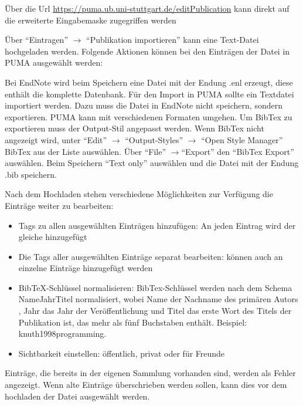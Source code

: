 \begin{tip} Über die Url \url{https://puma.ub.uni-stuttgart.de/editPublication} kann direkt auf die erweiterte Eingabemaske zugegriffen werden
\end{tip}		
Über \enquote{Eintragen} $\to$ \enquote{Publikation importieren} kann eine Text-Datei hochgeladen werden. Folgende Aktionen können bei den Einträgen der Datei in PUMA ausgewählt werden:
\begin{tip}
Bei EndNote wird beim Speichern eine Datei mit der Endung .enl erzeugt, diese enthält die komplette Datenbank. Für den Import in PUMA sollte ein Textdatei importiert werden. Dazu muss die Datei in EndNote nicht speichern, sondern exportieren. PUMA kann mit verschiedenen Formaten umgehen. Um BibTex zu exportieren muss der Output-Stil angepasst werden. Wenn BibTex nicht angezeigt wird, unter \enquote{Edit} $\to$ \enquote{Output-Styles} $\to$ \enquote{Open Style Manager} BibTex aus der Liste auswählen. Über \enquote{File} $\to$\enquote{Export} den \enquote{BibTex Export} auswählen. Beim Speichern \enquote{Text only} auswählen und die Datei mit der Endung .bib speichern.
\end{tip}
Nach dem Hochladen stehen verschiedene Möglichkeiten zur Verfügung die Einträge weiter zu bearbeiten:
\begin{itemize}
\item Tags zu allen ausgewählten Einträgen hinzufügen: An jeden Eintrag wird der gleiche \tag hinzugefügt
\item Die Tags aller ausgewählten Einträge separat bearbeiten: \tags können auch an einzelne Einträge hinzugefügt werden
\item BibTeX-Schlüssel normalisieren: BibTex-Schlüssel werden nach dem Schema NameJahrTitel normalisiert, wobei Name der Nachname des primären Autors , Jahr das Jahr der Veröffentlichung und Titel das erste Wort des Titels der Publikation ist, das mehr als fünf Buchstaben enthält. Beispiel: knuth1998programming.
\item Sichtbarkeit einstellen: öffentlich, privat oder für Freunde 
\end{itemize}
\begin{tip} Einträge, die bereits in der eigenen Sammlung vorhanden sind, werden als Fehler angezeigt. Wenn alte Einträge überschrieben werden sollen, kann dies vor dem hochladen der Datei ausgewählt werden.
\end{tip}

